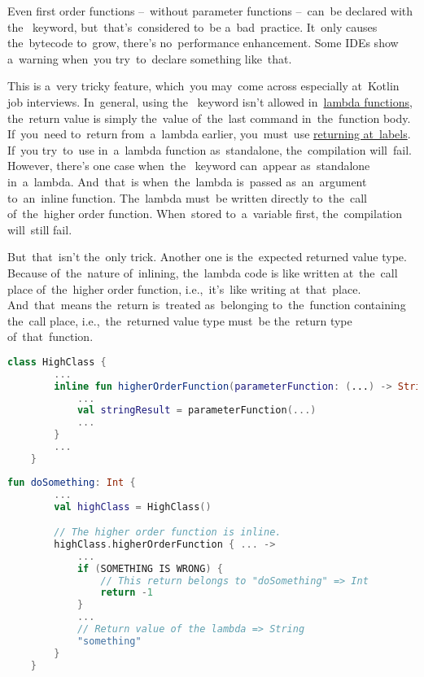 \note Even first order functions --~without parameter functions --~can~be declared with the~ keyword, but~that's~considered to~be a~bad~practice.
It~only causes the~bytecode to~grow, there's no~performance enhancement.
Some IDEs show a~warning when~you try~to~declare something like~that.

\label{kotlinnonlocalreturn}
This is a~very tricky feature, which~you may~come across especially at~Kotlin job interviews.
In~general, using the~ keyword isn't allowed in~\hyperref[kotlinlambda]{lambda functions}, the~return value is simply the~value of~the~last command in~the~function body.
If~you~need to~return from~a~lambda earlier, you~must~use \hyperref[kotlinreturnatlabel]{returning at~labels}.
If~you try~to~use  in~a~lambda function as~standalone, the~compilation will~fail.
However, there's one case when~the~ keyword can~appear as~standalone in~a~lambda.
And~that~is when~the~lambda is~passed as~an~argument to~an~inline function.
The~lambda must~be written directly to~the~call of~the~higher order function.
When~stored to~a~variable first, the~compilation will~still fail.

But~that~isn't the~only trick.
Another one is the~expected returned value type.
Because of~the~nature of~inlining, the~lambda code is like written at~the~call place of~the~higher order function, i.e.,~it's~like writing  at~that~place.
And~that~means the~return is~treated as~belonging to~the~function containing the~call place, i.e.,~the~returned value type must~be the~return type of~that~function.

\example
\begin{lstlisting}[language=Kotlin, title={Parameter function returns String}]
    class HighClass {
        ...
        inline fun higherOrderFunction(parameterFunction: (...) -> String) {
            ...
            val stringResult = parameterFunction(...)
            ...
        }
        ...
    }
\end{lstlisting}
\begin{lstlisting}[language=Kotlin, title={Function returns Int}]
   fun doSomething: Int {
        ...
        val highClass = HighClass()

        // The higher order function is inline.
        highClass.higherOrderFunction { ... ->
            ...
            if (SOMETHING IS WRONG) {
                // This return belongs to "doSomething" => Int
                return -1
            }
            ...
            // Return value of the lambda => String
            "something"
        }
    }
\end{lstlisting}

